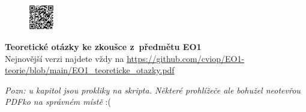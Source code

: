 \documentclass[a4paper,12pt]{article}   %
\begin{document}




\pagestyle{fancy}                                       %
\renewcommand{\headrulewidth}{0.5pt}                      %
\renewcommand{\footrulewidth}{0pt}                    %
\lhead{}        \rhead{}                        %
\lfoot{} \cfoot{} \rfoot{}   %
\begin{figure}
    \centering
    \includegraphics[width=0.1\textwidth]{git-qr.pdf}
\end{figure}

\begin{center}
    {\Large \textbf{Teoretické otázky ke zkoušce z~předmětu EO1}}\\
    {\normalfont Nejnovější verzi najdete vždy na \url{https://github.com/cviop/EO1-teorie/blob/main/EO1_teoreticke_otazky.pdf}}\\
\end{center}

\textit{Pozn: u kapitol jsou prokliky na skripta. Některé prohlížeče ale bohužel neotevřou PDFko na správném místě} :(


\end{document}

